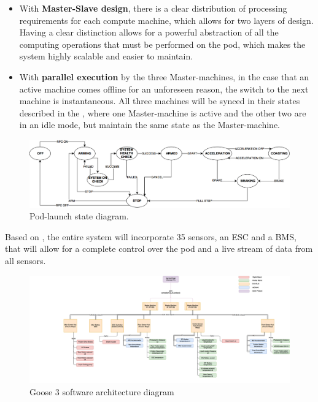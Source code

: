 \begin{itemize}
    \item With \textbf{Master-Slave design}, there is a clear distribution of processing requirements for each compute machine, which allows for two layers of design. Having a clear distinction allows for a powerful abstraction of all the computing operations that must be performed on the pod, which makes the system highly scalable and easier to maintain.
    \item With \textbf{parallel execution} by the three Master-machines, in the case that an active machine comes offline for an unforeseen reason, the switch to the next machine is instantaneous. All three machines will be synced in their states described in the , where one Master-machine is active and the other two are in an idle mode, but maintain the same state as the Master-machine.
\end{itemize}

\begin{figure}
  \centering
  \includegraphics[width=\textwidth]{images/pod_state_diag.png}
  \caption{Pod-launch state diagram.}
  \label{fig:pod-state-diag}
\end{figure}

Based on , the entire system will incorporate 35 sensors, an ESC and a BMS, that will allow for a complete control over the pod and a live stream of data from all sensors.

\begin{figure}
  \centering
  \includegraphics[width=\textwidth]{images/pod_comp_arch.png}
  \caption{Goose 3 software architecture diagram}
  \label{fig:software-diagram}
\end{figure}

